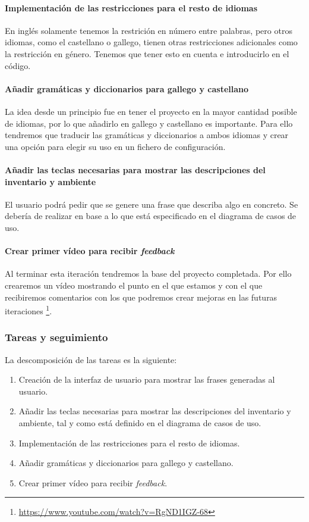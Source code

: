 \paragraph{Implementación de las restricciones para el resto de idiomas} En inglés solamente tenemos la restrición en número entre palabras, pero otros idiomas, como el castellano o gallego, tienen otras restricciones adicionales como la restricción en género. Tenemos que tener esto en cuenta e introducirlo en el código.

\paragraph{Añadir gramáticas y diccionarios para gallego y castellano} La idea desde un principio fue en tener el proyecto en la mayor cantidad posible de idiomas, por lo que añadirlo en gallego y castellano es importante. Para ello tendremos que traducir las gramáticas y diccionarios a ambos idiomas y crear una opción para elegir su uso en un fichero de configuración.

\paragraph{Añadir las teclas necesarias para mostrar las descripciones del inventario y ambiente} El usuario podrá pedir que se genere una frase que describa algo en concreto. Se debería de realizar en base a lo que está especificado en el diagrama de casos de uso.

\paragraph{Crear primer vídeo para recibir \textit{feedback}} Al terminar esta iteración tendremos la base del proyecto completada. Por ello crearemos un vídeo mostrando el punto en el que estamos y con el que recibiremos comentarios con los que podremos crear mejoras en las futuras iteraciones \footnote{\url{https://www.youtube.com/watch?v=RgND1IGZ-68}}.

\subsubsection{Tareas y seguimiento}

La descomposición de las tareas es la siguiente:

\begin{enumerate}[label=\bfseries WBS 6.\arabic*]
  \item Creación de la interfaz de usuario para mostrar las frases generadas al usuario.
  \item Añadir las teclas necesarias para mostrar las descripciones del inventario y ambiente, tal y como está definido en el diagrama de casos de uso.
  \item Implementación de las restricciones para el resto de idiomas.
  \item Añadir gramáticas y diccionarios para gallego y castellano.
  \item Crear primer vídeo para recibir \textit{feedback}.
\end{enumerate}

